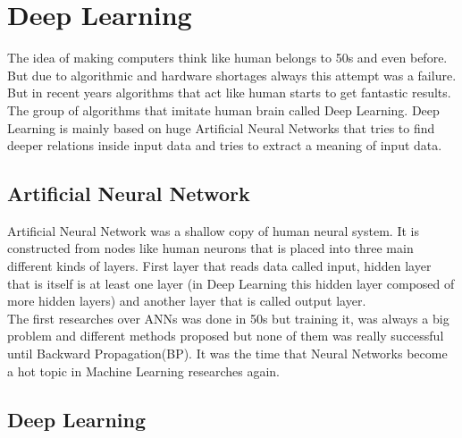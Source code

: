 \chapter{Deep Learning}\label{DeepLearning}
The idea of making computers think like human belongs to 50s and even before. But due to algorithmic and hardware shortages always this  attempt was a failure. But in recent years algorithms that act like human starts to get fantastic results. The group of algorithms that imitate human brain called Deep Learning. Deep Learning is mainly based on huge Artificial Neural Networks that tries to find deeper relations inside input data and tries to extract a meaning of input data.
\section{Artificial Neural Network}
Artificial Neural Network was a shallow copy of human neural system. It is constructed from nodes like human neurons that is placed into three main different kinds of layers. First layer that reads data called input, hidden layer that is itself is at least one layer (in Deep Learning this hidden layer composed of more hidden layers) and another layer that is called output layer. \\
The first researches over ANNs was done in 50s but training it, was always a big problem and different methods proposed but none of them was really successful until Backward Propagation(BP). It was the time that Neural Networks become a hot topic in Machine Learning researches again.\\
\section{Deep Learning}
 